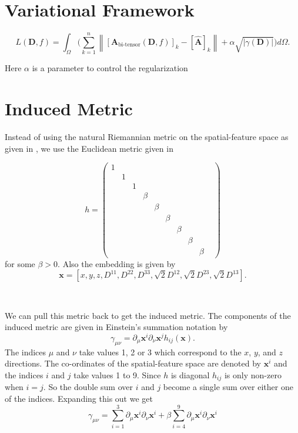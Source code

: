 \documentclass[12pt]{article}
\newcommand{\vect}[1]{\mathbf{#1}}
\begin{document}
\section{Variational Framework}


$$L(\vect{D}, f) = \int_\Omega \bigg( \sum_{k=1}^n
\left\lVert[\vect{A}_{\text{bi-tensor}}(\vect{D}, f)]_k - 
[\hat{\vect{A}}]_k \right\rVert
+ \alpha \sqrt{|\gamma(\vect{D})|} \bigg) d\Omega.$$ 

Here $\alpha$ is a parameter to control the regularization


\section{Induced Metric}

Instead of using the natural Riemannian metric on the spatial-feature space as
given in \cite{Pasternak2009}, we use the Euclidean metric given in
\cite{Pasternak2014} 

$$
h = 
\begin{pmatrix}
1 & & & & & & & & \\
 & 1 & & & & & & & \\
 & & 1 & & & & & & \\
 & & & \beta & & & & & \\
 & & & & \beta & & & & \\
 & & & & & \beta & & & \\
 & & & & & & \beta & & \\
 & & & & & & & \beta & \\
 & & & & & & & & \beta & 
\end{pmatrix}
$$
for some $\beta > 0$. Also the embedding is given by 
$$ \vect{x} = [x, y, z, D^{1 1}, D^{2 2}, D^{3 3}, \sqrt{2} D^{1 2}, \sqrt{2}
D^{2 3}, \sqrt{2} D^{1 3}].$$


\ 

\noindent
We can pull this metric back to get the induced metric. The components of the
induced metric are given in Einstein's summation notation by $$ \gamma_{\mu
\nu} = \partial_\mu \vect{x}^i \partial_\nu \vect{x}^j h_{ij}(\vect{x}).$$ The
indices $\mu$ and $\nu$ take values 1, 2 or 3 which correspond to the $x$, $y$,
and $z$ directions. The co-ordinates of the spatial-feature space are denoted
by $\vect{x}^i$ and the indices $i$ and $j$ take values 1 to 9.  Since $h$ is
diagonal $h_{i j}$ is only non-zero when $i = j$. So the double sum over $i$
and $j$ become a single sum over either one of the indices.  Expanding this out
we get 
$$\gamma_{\mu \nu} = 
\sum_{i=1}^3 \partial_\mu \vect{x}^i \partial_\nu \vect{x}^i + 
\beta \sum_{i=4}^9 \partial_\mu \vect{x}^i \partial_\nu \vect{x}^i$$
\end{document}
